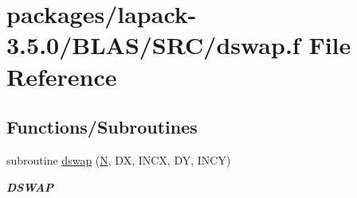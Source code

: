 \hypertarget{lapack-3_85_80_2BLAS_2SRC_2dswap_8f}{}\section{packages/lapack-\/3.5.0/\+B\+L\+A\+S/\+S\+R\+C/dswap.f File Reference}
\label{lapack-3_85_80_2BLAS_2SRC_2dswap_8f}
\subsection*{Functions/\+Subroutines}
\begin{DoxyCompactItemize}
\item 
subroutine \hyperlink{group__double__blas__level1_gaca2757ba2c3b2c6fc5d729b50345fac0}{dswap} (\hyperlink{polmisc_8c_a0240ac851181b84ac374872dc5434ee4}{N}, D\+X, I\+N\+C\+X, D\+Y, I\+N\+C\+Y)
\begin{DoxyCompactList}\small\item\em {\bfseries D\+S\+W\+A\+P} \end{DoxyCompactList}\end{DoxyCompactItemize}
